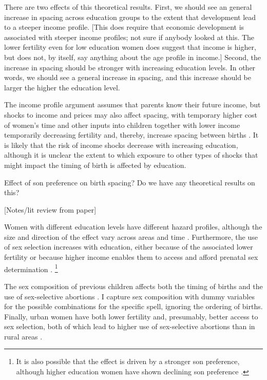 There are two effects of this theoretical results.
First, we should see an general increase in spacing across education groups to the extent that
development lead to a steeper income profile.
[This does require that economic development is associated with steeper income profiles;
not sure if anybody looked at this.
The lower fertility even for low education women does suggest that income is higher,
but does not, by itself, say anything about the age profile in income.]
Second, the increase in spacing should be stronger with increasing education levels.
In other words, we should see a general increase in spacing, and this increase should be
larger the higher the education level.

The income profile argument assumes that parents know their future income, but 
shocks to income and prices may also affect spacing, with temporary higher cost of women's time
and other inputs into children together with lower income temporarily decreasing fertility 
and, thereby, increase spacing between births \citep{Moffitt1984,Hotz1988,Portner2001,Alam2018}.
It is likely that the risk of income shocks decrease with increasing education, although it
is unclear the extent to which exposure to other types of shocks that might impact the timing
of birth is affected by education.


Effect of son preference on birth spacing?
Do we have any theoretical results on this?



[Notes/lit review from paper]

Women with different education levels have different hazard profiles, although the size 
and direction of the effect vary across areas and time 
\citep{Tulasidhar1993,Whitworth2002,Bhalotra2008,Kim2010,Soest2018}.
Furthermore, the use of sex selection increases with education, either because of the 
associated lower fertility or because higher income enables them to access and
afford prenatal sex determination
\citep{das_gupta97,retherford03b,jha06,Guilmoto2009a,Bongaarts2013,Portner2015b,Jayachandran2017}.%
\footnote{
It is also possible that the effect is driven by a stronger son preference, although 
higher education women have shown declining son preference \citep{bhat03,pande07}.
}


The sex composition of previous children affects both the timing of births and the use of 
sex-selective abortions 
\citep{retherford03b,jha06,Bhalotra2008,abrevaya09,Portner2015b,Kumar2016,Soest2018}.
I capture sex composition with dummy variables for the
possible combinations for the specific spell, ignoring the ordering of births.
Finally, urban women have both lower fertility and, presumably, better access to
sex selection, both of which lead to higher use of sex-selective abortions than in 
rural areas \citep{retherford03b,jha06,Portner2015b}.


